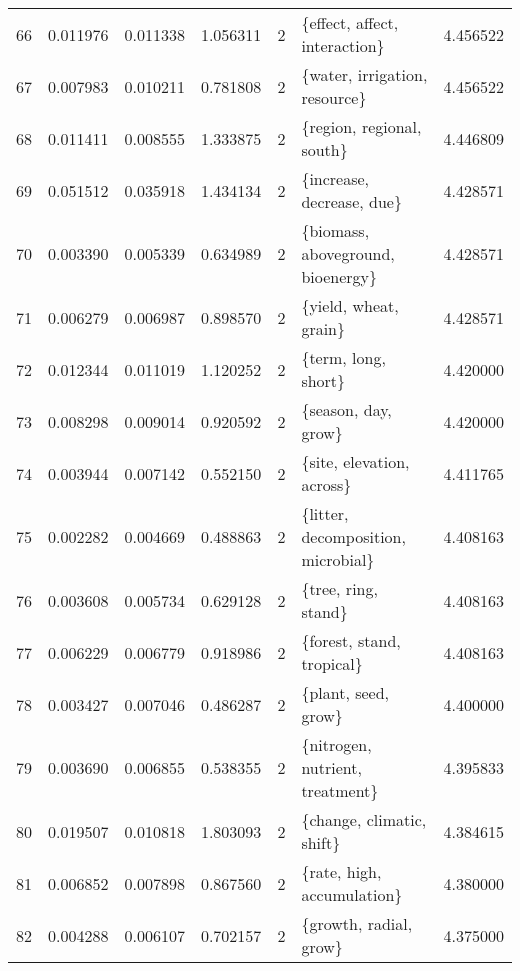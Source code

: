 \begin{tabular}{lrrrrlr}
66  &    0.011976 &  0.011338 &        1.056311 &           2 &           \{effect, affect, interaction\} &  4.456522 \\
67  &    0.007983 &  0.010211 &        0.781808 &           2 &           \{water, irrigation, resource\} &  4.456522 \\
68  &    0.011411 &  0.008555 &        1.333875 &           2 &               \{region, regional, south\} &  4.446809 \\
69  &    0.051512 &  0.035918 &        1.434134 &           2 &               \{increase, decrease, due\} &  4.428571 \\
70  &    0.003390 &  0.005339 &        0.634989 &           2 &       \{biomass, aboveground, bioenergy\} &  4.428571 \\
71  &    0.006279 &  0.006987 &        0.898570 &           2 &                   \{yield, wheat, grain\} &  4.428571 \\
72  &    0.012344 &  0.011019 &        1.120252 &           2 &                     \{term, long, short\} &  4.420000 \\
73  &    0.008298 &  0.009014 &        0.920592 &           2 &                     \{season, day, grow\} &  4.420000 \\
74  &    0.003944 &  0.007142 &        0.552150 &           2 &               \{site, elevation, across\} &  4.411765 \\
75  &    0.002282 &  0.004669 &        0.488863 &           2 &      \{litter, decomposition, microbial\} &  4.408163 \\
76  &    0.003608 &  0.005734 &        0.629128 &           2 &                     \{tree, ring, stand\} &  4.408163 \\
77  &    0.006229 &  0.006779 &        0.918986 &           2 &               \{forest, stand, tropical\} &  4.408163 \\
78  &    0.003427 &  0.007046 &        0.486287 &           2 &                     \{plant, seed, grow\} &  4.400000 \\
79  &    0.003690 &  0.006855 &        0.538355 &           2 &         \{nitrogen, nutrient, treatment\} &  4.395833 \\
80  &    0.019507 &  0.010818 &        1.803093 &           2 &               \{change, climatic, shift\} &  4.384615 \\
81  &    0.006852 &  0.007898 &        0.867560 &           2 &              \{rate, high, accumulation\} &  4.380000 \\
82  &    0.004288 &  0.006107 &        0.702157 &           2 &                  \{growth, radial, grow\} &  4.375000 \\

\end{tabular}
